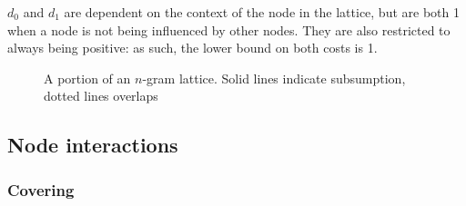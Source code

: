 \documentclass[11pt]{article}
\begin{document}
$d_0$ and $d_1$ are dependent on the context of the node in the lattice, but are both 1 when a node is not being influenced by other nodes. They are also restricted to always being positive: as such, the lower bound on both costs is 1.





\begin{figure}[!tb]
\caption{A portion of an $n$-gram lattice. Solid lines indicate subsumption, dotted lines overlaps}
\label{fig:example}
\end{figure}

\subsection{Node interactions}

\subsubsection{Covering}
\end{document}
